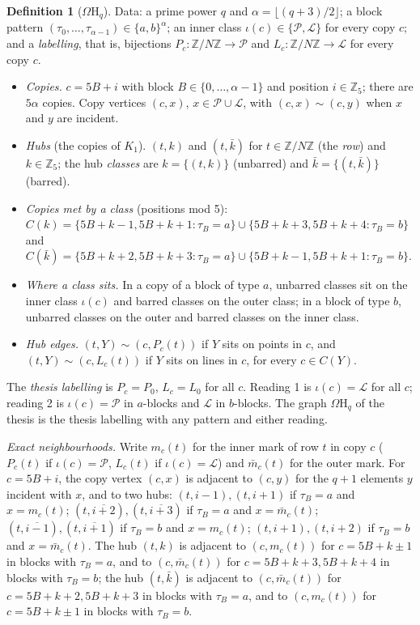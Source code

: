 \documentclass[11pt]{amsart}
\theoremstyle{definition}
\newtheorem{definition}[theorem]{Definition}
\theoremstyle{remark}
\numberwithin{equation}{section}
\newcommand{\Z}{\mathbb Z}
\newcommand{\cL}{\mathcal L}
\newcommand{\cP}{\mathcal P}
\newcommand{\Om}{\Omega\mathrm H}
\begin{document}
\begin{definition}[$\Om_q$]\label{def:omega}
Data: a prime power $q$ and $\alpha=\lfloor(q+3)/2\rfloor$; a block pattern $(\tau_0,\dots,\tau_{\alpha-1})\in\{a,b\}^\alpha$;
an inner class $\iota(c)\in\{\cP,\cL\}$ for every copy $c$; and a \emph{labelling}, that is, bijections $P_c:\Z/N\Z\to\cP$
and $L_c:\Z/N\Z\to\cL$ for every copy $c$.
\begin{itemize}
\item \emph{Copies.} $c=5B+i$ with block $B\in\{0,\dots,\alpha-1\}$ and position $i\in\Z_5$; there are $5\alpha$ copies.
  Copy vertices $(c,x)$, $x\in\cP\cup\cL$, with $(c,x)\sim(c,y)$ when $x$ and $y$ are incident.
\item \emph{Hubs} (the copies of $K_1$). $(t,k)$ and $(t,\bar k)$ for $t\in\Z/N\Z$ (the \emph{row}) and $k\in\Z_5$; the
  hub \emph{classes} are $k=\{(t,k)\}$ (unbarred) and $\bar k=\{(t,\bar k)\}$ (barred).
\item \emph{Copies met by a class} (positions mod 5):
  $C(k)=\{5B+k-1,5B+k+1:\tau_B=a\}\cup\{5B+k+3,5B+k+4:\tau_B=b\}$ and
  $C(\bar k)=\{5B+k+2,5B+k+3:\tau_B=a\}\cup\{5B+k-1,5B+k+1:\tau_B=b\}$.
\item \emph{Where a class sits.} In a copy of a block of type $a$, unbarred classes sit on the inner class $\iota(c)$ and
  barred classes on the outer class; in a block of type $b$, unbarred classes on the outer and barred classes on the inner
  class.
\item \emph{Hub edges.} $(t,Y)\sim(c,P_c(t))$ if $Y$ sits on points in $c$, and $(t,Y)\sim(c,L_c(t))$ if $Y$ sits on lines in
  $c$, for every $c\in C(Y)$.
\end{itemize}
The \emph{thesis labelling} is $P_c=P_0$, $L_c=L_0$ for all $c$. Reading 1 is $\iota(c)=\cL$ for all $c$; reading 2 is
$\iota(c)=\cP$ in $a$-blocks and $\cL$ in $b$-blocks. The graph $\Om_q$ of the thesis is the thesis labelling with any
pattern and either reading.
\end{definition}

\emph{Exact neighbourhoods.} Write $m_c(t)$ for the inner mark of row $t$ in copy $c$ ($P_c(t)$ if $\iota(c)=\cP$, $L_c(t)$
if $\iota(c)=\cL$) and $\bar m_c(t)$ for the outer mark. For $c=5B+i$, the copy vertex $(c,x)$ is adjacent to $(c,y)$ for the
$q+1$ elements $y$ incident with $x$, and to two hubs: $(t,i-1),(t,i+1)$ if $\tau_B=a$ and $x=m_c(t)$;
$(t,\overline{i+2}),(t,\overline{i+3})$ if $\tau_B=a$ and $x=\bar m_c(t)$; $(t,\overline{i-1}),(t,\overline{i+1})$ if
$\tau_B=b$ and $x=m_c(t)$; $(t,i+1),(t,i+2)$ if $\tau_B=b$ and $x=\bar m_c(t)$. The hub $(t,k)$ is adjacent to
$(c,m_c(t))$ for $c=5B+k\pm1$ in blocks with $\tau_B=a$, and to $(c,\bar m_c(t))$ for $c=5B+k+3,5B+k+4$ in blocks with
$\tau_B=b$; the hub $(t,\bar k)$ is adjacent to $(c,\bar m_c(t))$ for $c=5B+k+2,5B+k+3$ in blocks with $\tau_B=a$, and to
$(c,m_c(t))$ for $c=5B+k\pm1$ in blocks with $\tau_B=b$.
\end{document}
